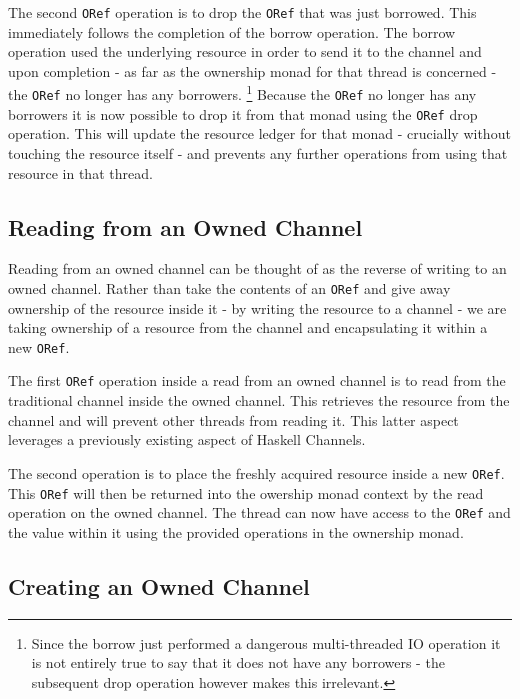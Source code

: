 \documentclass[onehalf,11pt]{beavtex}
\begin{document}
The second \texttt{ORef} operation is to drop the \texttt{ORef} that was just
borrowed. This immediately follows the completion of the borrow operation. The
borrow operation used the underlying resource in order to send it to the channel
and upon completion - as far as the ownership monad for that thread is
concerned - the \texttt{ORef} no longer has any borrowers.
\footnote{Since the borrow just performed a dangerous multi-threaded IO operation
  it is not entirely true to say that it does not have any borrowers - the
  subsequent drop operation however makes this irrelevant.}
Because the \texttt{ORef} no longer has any borrowers it is now possible to
drop it from that monad using the \texttt{ORef} drop operation.  This will
update the resource ledger for that monad - crucially without touching the
resource itself - and prevents any further operations from using that resource
in that thread.

\subsection{Reading from an Owned Channel}

Reading from an owned channel can be thought of as the reverse of
writing to an owned channel.  Rather than take the contents of an
\texttt{ORef} and give away ownership of the resource inside it - by writing the
resource to a channel - we are taking ownership of a resource from the channel
and encapsulating it within a new \texttt{ORef}.

The first \texttt{ORef} operation inside a read from an owned channel
is to read from the traditional channel inside the owned channel. This
retrieves the resource from the channel and will prevent other threads from
reading it. This latter aspect leverages a previously existing aspect of
Haskell Channels. %

The second operation is to place the freshly acquired resource inside a new
\texttt{ORef}.  This \texttt{ORef} will then be returned into the
owership monad context by the read operation on the
owned channel.  The thread can now have access to the \texttt{ORef}
and the value within it using the provided operations in the
ownership monad.


\subsection{Creating an Owned Channel}
\end{document}
